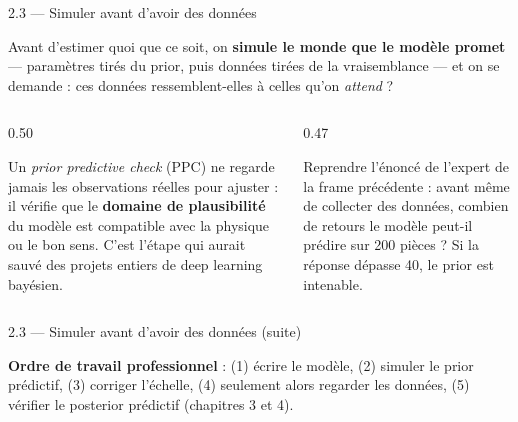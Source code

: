 \begin{frame}{2.3 — Simuler avant d'avoir des données}
\begin{kbox}
Avant d'estimer quoi que ce soit, on \textbf{simule le monde que le modèle
promet} — paramètres tirés du prior, puis données tirées de la vraisemblance — et
on se demande : ces données ressemblent-elles à celles qu'on \emph{attend} ?
\end{kbox}
\vspace{1mm}
\begin{columns}[t]
\begin{column}{0.50\textwidth}
\begin{ebox}
Un \emph{prior predictive check} (PPC) ne regarde jamais les observations réelles
pour ajuster : il vérifie que le \textbf{domaine de plausibilité} du modèle est
compatible avec la physique ou le bon sens. C'est l'étape qui aurait sauvé
des projets entiers de deep learning bayésien.
\end{ebox}
\end{column}
\begin{column}{0.47\textwidth}
\begin{abox}
Reprendre l'énoncé de l'expert de la frame précédente : avant même de collecter
des données, combien de retours le modèle peut-il prédire sur 200 pièces ?
Si la réponse dépasse 40, le prior est intenable.
\end{abox}
\end{column}
\end{columns}
\vspace{1mm}
\end{frame}

\begin{frame}{2.3 — Simuler avant d'avoir des données (suite)}
\begin{tcolorbox}[colback=byCyan!8,colframe=byCyan,arc=2mm,width=.95\textwidth]
\small\centering
\textbf{Ordre de travail professionnel} : (1) écrire le modèle, (2) simuler le prior
prédictif, (3) corriger l'échelle, (4) seulement alors regarder les données,
(5) vérifier le posterior prédictif (chapitres 3 et 4).
\end{tcolorbox}
\end{frame}

